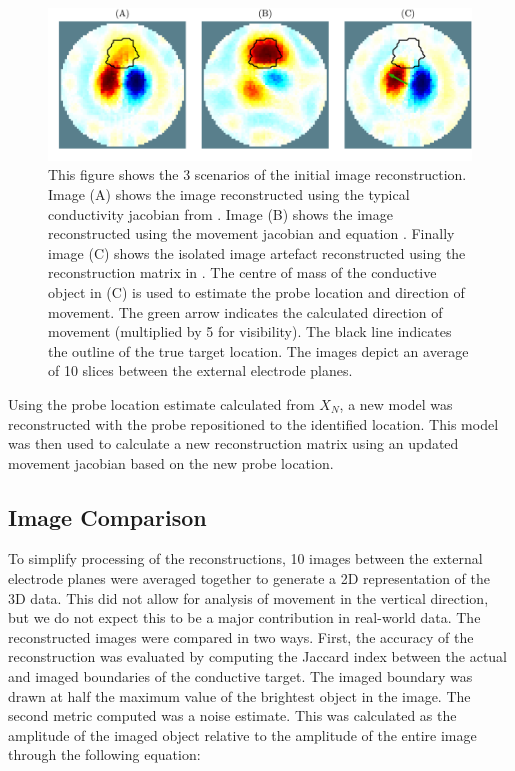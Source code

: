 \begin{figure}[H]
    \centering
   \includegraphics[width=\textwidth]{chapter7-internal_elec_motion/imgs/recon_methods.pdf} 
   \caption[Motion correction methods]{\label{fig:motion_correction_methods} 
   This figure shows the 3 scenarios of the initial image reconstruction. 
   Image (A) shows the image reconstructed using the typical conductivity jacobian 
   from . Image (B) shows the image reconstructed using the movement 
   jacobian and equation . Finally image (C) shows the 
   isolated image artefact reconstructed using the reconstruction matrix in 
   .
	The centre of mass of the conductive object in (C) is used to
	estimate the probe location and direction of movement. The green arrow indicates the 
	calculated direction of movement (multiplied by 5 for visibility).
	The black line indicates the outline of the true target location.
	The images depict an average of 10 slices between the external electrode planes.}
\end{figure}

Using the probe location estimate calculated from $X_N$,
a new model was reconstructed with the probe repositioned 
to the identified location. 
This model was then used to calculate a new reconstruction matrix 
using 
an updated movement jacobian based on the new probe location. 


\subsection{Image Comparison}
To simplify processing of the reconstructions, 10 images between the 
external electrode planes were averaged together to generate a 2D 
representation of the 3D data. This did not allow for analysis of movement in the vertical 
direction, but we do not expect this to be a major contribution in real-world data.
The reconstructed images were compared in two ways. First, the accuracy of the reconstruction
was evaluated by computing the Jaccard index \parencite{jaccard_distribution_1912} 
between the actual and imaged boundaries of the 
conductive target. The imaged boundary was drawn at half the maximum value of the brightest 
object in the image. The second metric computed was a noise estimate. This was calculated as
the amplitude of the imaged object relative to the amplitude of the entire image through the
following equation:

